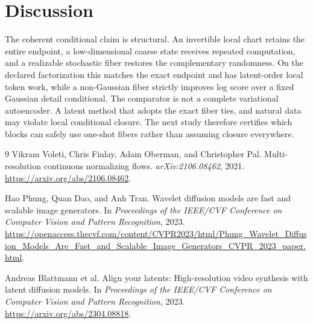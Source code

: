\documentclass[11pt]{article}
\begin{document}
\section{Discussion}

The coherent conditional claim is structural.  An invertible local chart retains the entire endpoint, a low-dimensional coarse state receives repeated computation, and a realizable stochastic fiber restores the complementary randomness.  On the declared factorization this matches the exact endpoint and has latent-order local token work, while a non-Gaussian fiber strictly improves log score over a fixed Gaussian detail conditional.  The comparator is not a complete variational autoencoder.  A latent method that adopts the exact fiber ties, and natural data may violate local conditional closure.  The next study therefore certifies which blocks can safely use one-shot fibers rather than assuming closure everywhere.

\begin{thebibliography}{9}
\small
{}
Vikram Voleti, Chris Finlay, Adam Oberman, and Christopher Pal.
\newblock Multi-resolution continuous normalizing flows.
\newblock \emph{arXiv:2106.08462}, 2021.
\newblock \url{https://arxiv.org/abs/2106.08462}.

Hao Phung, Quan Dao, and Anh Tran.
\newblock Wavelet diffusion models are fast and scalable image generators.
\newblock In \emph{Proceedings of the IEEE/CVF Conference on Computer Vision and Pattern Recognition}, 2023.
\newblock \url{https://openaccess.thecvf.com/content/CVPR2023/html/Phung_Wavelet_Diffusion_Models_Are_Fast_and_Scalable_Image_Generators_CVPR_2023_paper.html}.

Andreas Blattmann et al.
\newblock Align your latents: High-resolution video synthesis with latent diffusion models.
\newblock In \emph{Proceedings of the IEEE/CVF Conference on Computer Vision and Pattern Recognition}, 2023.
\newblock \url{https://arxiv.org/abs/2304.08818}.
\end{thebibliography}
\end{document}
